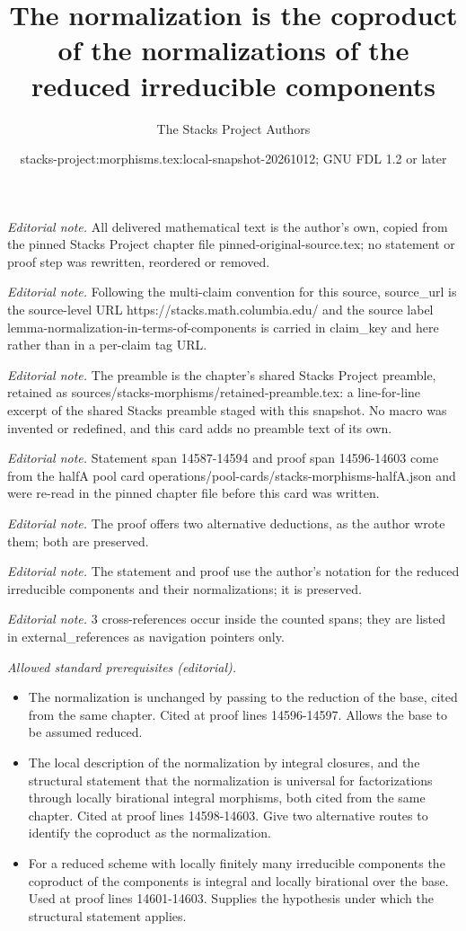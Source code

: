 \documentclass[10pt,a4paper]{amsart}
\title{The normalization is the coproduct of the normalizations of the reduced irreducible components}
\author{The Stacks Project Authors}
\date{stacks-project:morphisms.tex:local-snapshot-20261012; GNU FDL 1.2 or later}
\theoremstyle{plain}
\theoremstyle{definition}
\theoremstyle{remark}
\numberwithin{equation}{subsection}
\begin{document}
\maketitle
\noindent\textit{Editorial note.} All delivered mathematical text is the author's own, copied from the pinned Stacks Project chapter file pinned-original-source.tex; no statement or proof step was rewritten, reordered or removed.\par\medskip
\noindent\textit{Editorial note.} Following the multi-claim convention for this source, source\_url is the source-level URL https://stacks.math.columbia.edu/ and the source label lemma-normalization-in-terms-of-components is carried in claim\_key and here rather than in a per-claim tag URL.\par\medskip
\noindent\textit{Editorial note.} The preamble is the chapter's shared Stacks Project preamble, retained as sources/stacks-morphisms/retained-preamble.tex: a line-for-line excerpt of the shared Stacks preamble staged with this snapshot. No macro was invented or redefined, and this card adds no preamble text of its own.\par\medskip
\noindent\textit{Editorial note.} Statement span 14587-14594 and proof span 14596-14603 come from the halfA pool card operations/pool-cards/stacks-morphisms-halfA.json and were re-read in the pinned chapter file before this card was written.\par\medskip
\noindent\textit{Editorial note.} The proof offers two alternative deductions, as the author wrote them; both are preserved.\par\medskip
\noindent\textit{Editorial note.} The statement and proof use the author's notation for the reduced irreducible components and their normalizations; it is preserved.\par\medskip
\noindent\textit{Editorial note.} 3 cross-references occur inside the counted spans; they are listed in external\_references as navigation pointers only.\par\medskip
\noindent\textit{Allowed standard prerequisites (editorial).}\begin{itemize}
\item The normalization is unchanged by passing to the reduction of the base, cited from the same chapter. Cited at proof lines 14596-14597. Allows the base to be assumed reduced.
\item The local description of the normalization by integral closures, and the structural statement that the normalization is universal for factorizations through locally birational integral morphisms, both cited from the same chapter. Cited at proof lines 14598-14603. Give two alternative routes to identify the coproduct as the normalization.
\item For a reduced scheme with locally finitely many irreducible components the coproduct of the components is integral and locally birational over the base. Used at proof lines 14601-14603. Supplies the hypothesis under which the structural statement applies.
\end{itemize}\medskip
\end{document}
